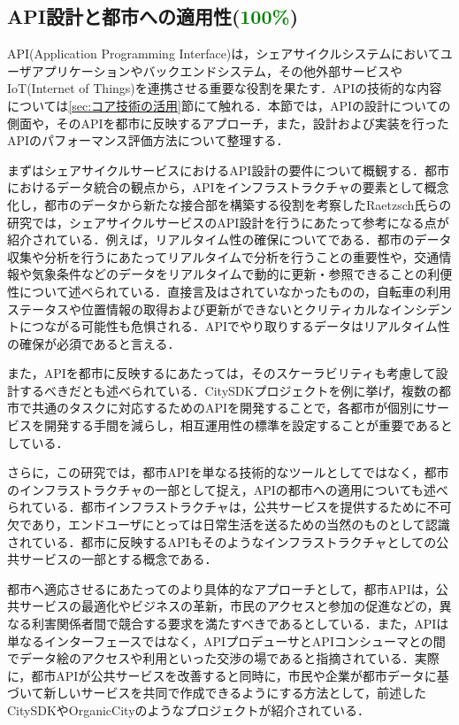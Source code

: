   \subsection{API設計と都市への適用性(\textcolor{green}{100\%})}
    \label{sec:API設計と都市への適用性}
      \par API(Application Programming Interface)は，シェアサイクルシステムにおいてユーザアプリケーションやバックエンドシステム，その他外部サービスやIoT(Internet of Things)を連携させる重要な役割を果たす．APIの技術的な内容については\ref{sec:コア技術の活用}節にて触れる．本節では，APIの設計についての側面や，そのAPIを都市に反映するアプローチ，また，設計および実装を行ったAPIのパフォーマンス評価方法について整理する．
      \par まずはシェアサイクルサービスにおけるAPI設計の要件について概観する．都市におけるデータ統合の観点から，APIをインフラストラクチャの要素として概念化し，都市のデータから新たな接合部を構築する役割を考察したRaetzsch氏らの研究では，シェアサイクルサービスのAPI設計を行うにあたって参考になる点が紹介されている．例えば，リアルタイム性の確保についてである．都市のデータ収集や分析を行うにあたってリアルタイムで分析を行うことの重要性や，交通情報や気象条件などのデータをリアルタイムで動的に更新・参照できることの利便性について述べられている．直接言及はされていなかったものの，自転車の利用ステータスや位置情報の取得および更新ができないとクリティカルなインシデントにつながる可能性も危惧される．APIでやり取りするデータはリアルタイム性の確保が必須であると言える．
      \par また，APIを都市に反映するにあたっては，そのスケーラビリティも考慮して設計するべきだとも述べられている．CitySDKプロジェクトを例に挙げ，複数の都市で共通のタスクに対応するためのAPIを開発することで，各都市が個別にサービスを開発する手間を減らし，相互運用性の標準を設定することが重要であるとしている．
      \par さらに，この研究では，都市APIを単なる技術的なツールとしてではなく，都市のインフラストラクチャの一部として捉え，APIの都市への適用についても述べられている．都市インフラストラクチャは，公共サービスを提供するために不可欠であり，エンドユーザにとっては日常生活を送るための当然のものとして認識されている．都市に反映するAPIもそのようなインフラストラクチャとしての公共サービスの一部とする概念である．
      \par 都市へ適応させるにあたってのより具体的なアプローチとして，都市APIは，公共サービスの最適化やビジネスの革新，市民のアクセスと参加の促進などの，異なる利害関係者間で競合する要求を満たすべきであるとしている．また，APIは単なるインターフェースではなく，APIプロデューサとAPIコンシューマとの間でデータ絵のアクセスや利用といった交渉の場であると指摘されている．実際に，都市APIが公共サービスを改善すると同時に，市民や企業が都市データに基づいて新しいサービスを共同で作成できるようにする方法として，前述したCitySDKやOrganicCityのようなプロジェクトが紹介されている．
